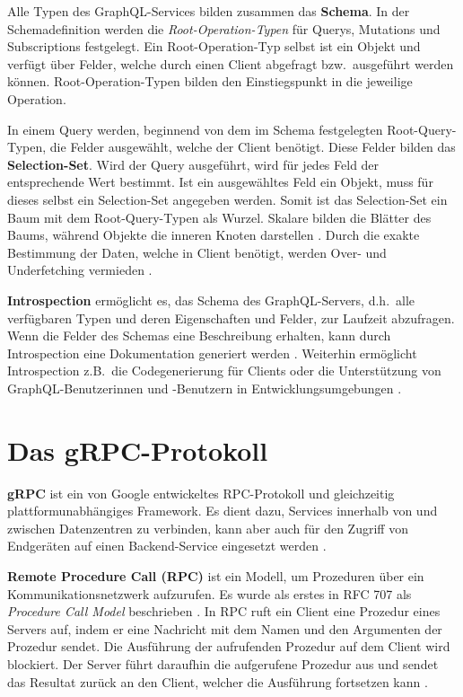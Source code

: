 
Alle Typen des GraphQL-Services bilden zusammen das \textbf{Schema}. In der Schemadefinition werden die \emph{Root-Operation-Typen} für Querys, Mutations und Subscriptions festgelegt. Ein Root-Operation-Typ selbst ist ein Objekt und verfügt über Felder, welche durch einen Client abgefragt bzw.\ ausgeführt werden können. Root-Operation-Typen bilden den Einstiegspunkt in die jeweilige Operation.

In einem Query werden, beginnend von dem im Schema festgelegten Root-Query-Typen, die Felder ausgewählt, welche der Client benötigt. Diese Felder bilden das \textbf{Selection-Set}. Wird der Query ausgeführt, wird für jedes Feld der entsprechende Wert bestimmt. Ist ein ausgewähltes Feld ein Objekt, muss für dieses selbst ein Selection-Set angegeben werden. Somit ist das Selection-Set ein Baum mit dem Root-Query-Typen als Wurzel. Skalare bilden die Blätter des Baums, während Objekte die inneren Knoten darstellen \autocite{Facebook2018}. Durch die exakte Bestimmung der Daten, welche in Client benötigt, werden Over- und Underfetching vermieden \autocite[S.~7ff.]{Porcello2018}.

\para{}\textbf{Introspection} ermöglicht es, das Schema des GraphQL-Servers, d.h.\ alle verfügbaren Typen und deren Eigenschaften und Felder, zur Laufzeit abzufragen. Wenn die Felder des Schemas eine Beschreibung erhalten, kann durch Introspection eine Dokumentation generiert werden \autocite[Abs.~4.2]{Facebook2018}. Weiterhin ermöglicht Introspection z.B.\ die Codegenerierung für Clients oder die Unterstützung von GraphQL-Benutzerinnen und -Benutzern in Entwicklungsumgebungen \autocite[S.~26]{Giroux2020}.

\section{Das gRPC-Protokoll}\label{sec:theory|grpc}

\textbf{gRPC} ist ein von Google entwickeltes RPC-Protokoll und gleichzeitig plattformunabhängiges Framework. Es dient dazu, Services innerhalb von und zwischen Datenzentren zu verbinden, kann aber auch für den Zugriff von Endgeräten auf einen Backend-Service eingesetzt werden \autocite{gRPC_About}.

\para{}\textbf{Remote Procedure Call (RPC)} ist ein Modell, um Prozeduren über ein Kommunikationsnetzwerk aufzurufen. Es wurde als erstes in RFC 707 als \textit{Procedure Call Model} beschrieben \autocite{RFC707}. In RPC ruft ein Client eine Prozedur eines Servers auf, indem er eine Nachricht mit dem Namen und den Argumenten der Prozedur sendet. Die Ausführung der aufrufenden Prozedur auf dem Client wird blockiert. Der Server führt daraufhin die aufgerufene Prozedur aus und sendet das Resultat zurück an den Client, welcher die Ausführung fortsetzen kann \autocite{RFC5531}.

